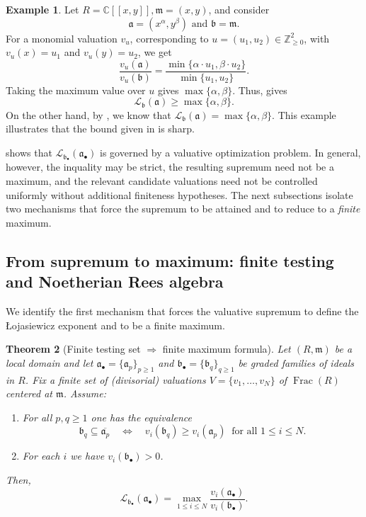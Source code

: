 \documentclass[12pt]{amsart}
\newcommand{\ZZ}{\mathbb{Z}}
\newcommand{\CC}{\mathbb{C}}
\newcommand{\m}{\mathfrak m}
\renewcommand{\a}{\mathfrak{a}}
\renewcommand{\b}{\mathfrak{b}}
\newcommand{\Loj}{\mathcal{L}} %
\DeclareMathOperator{\Frac}{Frac}
\newcommand{\abul}{{\a_\bullet}}
\newcommand{\bbul}{{\b_\bullet}}
\theoremstyle{plain}
\newtheorem{theorem}{Theorem}[section]
\theoremstyle{definition}
\newtheorem{example}[theorem]{Example}
\numberwithin{equation}{section}
\begin{document}
\begin{example}
	\label{ex.valuative-bound}
	Let $R = \CC[[x,y]], \m = (x,y)$, and consider 
	$$\a = (x^\alpha, y^\beta) \text{ and } \b = \m.$$
	For a monomial valuation $v_u$, corresponding to $u = (u_1,u_2) \in \ZZ^2_{\ge 0}$, with $v_u(x) = u_1$ and $v_u(y) = u_2$, we get
	$$\frac{v_u(\a)}{v_u(\b)} = \frac{\min\{\alpha \cdot u_1, \beta \cdot u_2\}}{\min \{u_1,u_2\}}.$$
	Taking the maximum value over $u$ gives $\max\{\alpha, \beta\}$. Thus,  gives
	$$\Loj_{\b}(\a) \ge \max\{\alpha, \beta\}.$$
	On the other hand, by , we know that $\Loj_{\b}(\a) = \max\{\alpha, \beta\}.$ This example illustrates that the bound given in  is sharp.
\end{example}

 shows that $\Loj_{\bbul}(\abul)$ is governed by a valuative
optimization problem. In general, however, the inquality may be strict, the resulting supremum need not be a maximum, and the relevant candidate valuations need not be controlled uniformly without additional
finiteness hypotheses. The next subsections isolate two mechanisms that force the supremum
to be attained and to reduce to a \emph{finite} maximum.


\subsection{From supremum to maximum: finite testing and Noetherian Rees algebra}
We identify the first mechanism that forces the valuative supremum to define the \L{}ojasiewicz exponent and to be a finite maximum.

\begin{theorem}[Finite testing set $\Rightarrow$ finite maximum formula]\label{thm:finite-testing-implies-max}
	Let $(R,\m)$ be a local domain and let
	$\abul=\{\a_p\}_{p\ge 1}$ and $\bbul=\{\b_q\}_{q\ge 1}$ be graded families of ideals in $R$.
	Fix a finite set of (divisorial) valuations $V=\{v_1,\dots,v_N\}$ of $\Frac(R)$ centered at $\m$.
	Assume:
	\begin{enumerate}
		\item[(H1)] For all $p,q\ge 1$ one has the equivalence
		\begin{equation}\label{eq:finite-testing-equivalence}
			\b_q\subseteq \overline{\a_p}
			\quad\Longleftrightarrow\quad
			v_i(\b_q)\ge v_i(\a_p)\ \text{ for all }1\le i\le N.
		\end{equation}
		\item[(H2)] For each $i$ we have $v_i(\bbul)>0$.
	\end{enumerate}
	Then,
	\[
		\Loj_{\bbul}(\abul) = \max_{1\le i\le N}\frac{v_i(\abul)}{v_i(\bbul)}.
	\]
\end{theorem}
\end{document}

